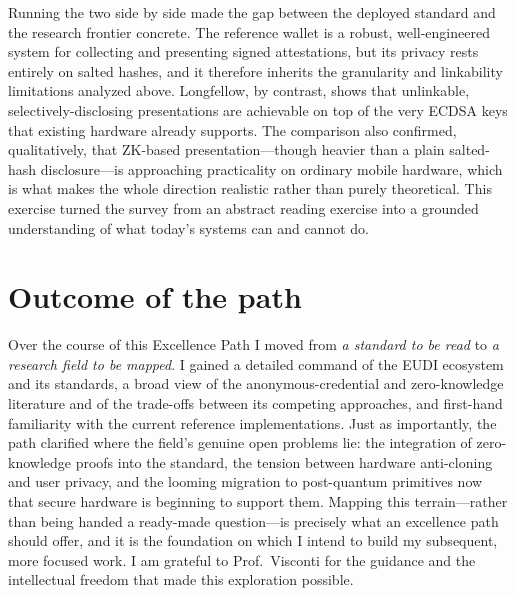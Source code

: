 \documentclass[11pt]{article}
\begin{document}
Running the two side by side made the gap between the deployed standard and the research frontier concrete. The reference wallet is a robust, well-engineered system for collecting and presenting signed attestations, but its privacy rests entirely on salted hashes, and it therefore inherits the granularity and linkability limitations analyzed above. Longfellow, by contrast, shows that unlinkable, selectively-disclosing presentations are achievable on top of the very ECDSA keys that existing hardware already supports. The comparison also confirmed, qualitatively, that ZK-based presentation---though heavier than a plain salted-hash disclosure---is approaching practicality on ordinary mobile hardware, which is what makes the whole direction realistic rather than purely theoretical. This exercise turned the survey from an abstract reading exercise into a grounded understanding of what today's systems can and cannot do.

\section{Outcome of the path}
Over the course of this Excellence Path I moved from \emph{a standard to be read} to \emph{a research field to be mapped}. I gained a detailed command of the EUDI ecosystem and its standards, a broad view of the anonymous-credential and zero-knowledge literature and of the trade-offs between its competing approaches, and first-hand familiarity with the current reference implementations. Just as importantly, the path clarified where the field's genuine open problems lie: the integration of zero-knowledge proofs into the standard, the tension between hardware anti-cloning and user privacy, and the looming migration to post-quantum primitives now that secure hardware is beginning to support them. Mapping this terrain---rather than being handed a ready-made question---is precisely what an excellence path should offer, and it is the foundation on which I intend to build my subsequent, more focused work. I am grateful to Prof.\ Visconti for the guidance and the intellectual freedom that made this exploration possible.
\end{document}
